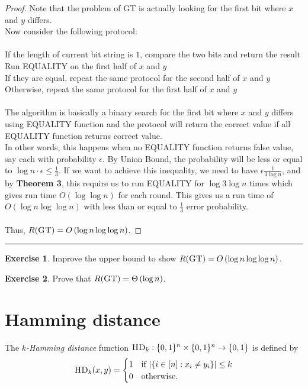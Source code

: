 \documentclass[11pt,oneside]{book}
\theoremstyle{plain}
\theoremstyle{definition}
\newtheorem{exercise}{Exercise}
\theoremstyle{plain}
\newcommand{\GT}{\textsc{GT}}
\newcommand{\HD}{\textsc{HD}}
\newcommand{\exercises}{\bigskip \noindent\rule{8cm}{0.4pt} \medskip}
\begin{document}
\begin{proof}
	Note that the problem of GT is actually looking for the first bit where $x$ and $y$ differs. \\
	Now consider the following protocol: \\
	\\
	If the length of current bit string is $1$, compare the two bits and return the result\\
	Run EQUALITY on the first half of $x$ and $y$\\
	If they are equal, repeat the same protocol for the second half of $x$ and $y$\\
	Otherwise, repeat the same protocol for the first half of $x$ and $y$\\
	\\
	The algorithm is basically a binary search for the first bit where $x$ and $y$ differs using EQUALITY function and the protocol will return the correct value if all EQUALITY function returns correct value. \\
	In other words, this happens when no EQUALITY function returns false value, say each with probability $\epsilon$. By Union Bound, the probability will be less or equal to $\log n\cdot\epsilon \leq \frac13$. If we want to achieve this inequality, we need to have $\epsilon \frac{1}{3\log n}$, and by \textbf{Theorem 3}, this require us to run EQUALITY for $\log 3\log n$ times which gives run time $O(\log \log n)$ for each round. This gives us a run time of $O(\log n \log \log n)$ with less than or equal to $\frac13$ error probability.\\
	\\
	Thus, $R(\GT) = O\left(\log n \log \log n \right)$.
\end{proof}

\exercises

\begin{exercise}
	Improve the upper bound to show $R(\GT) = O\left(\log n \log \log n \right)$.
\end{exercise}

\begin{exercise}
	Prove that $R(\GT) = \Theta\left(\log n \right)$.
\end{exercise}


 
\section{Hamming distance}

The \emph{$k$-Hamming distance} function $\HD_k : \{0,1\}^n \times \{0,1\}^n \to \{0,1\}$ is defined by
\[
\HD_k(x,y) = \begin{cases}
1 & \mbox{if } |\{i \in [n] : x_i \neq y_i\}| \le k \\
0 & \mbox{otherwise.}
\end{cases}
\]
\end{document}
